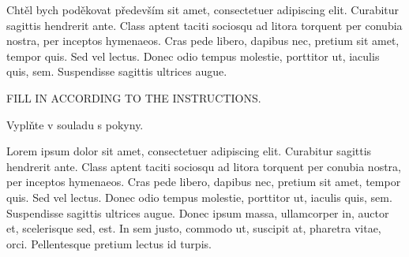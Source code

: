 \documentclass[czech,master]{ctufit-thesis}
\begin{document}
 
\frontmatter\frontmatterinit



\thispagestyle{empty}
\cleardoublepage

\maketitle

\imprintpage

\tableofcontents
\listoffigures
\begingroup
\let\clearpage\relax
\listoftables
\lstlistoflistings
\endgroup

\begin{acknowledgmentpage}
	Chtěl bych poděkovat především sit amet, consectetuer adipiscing elit. Curabitur sagittis hendrerit ante. Class aptent taciti sociosqu ad litora torquent per conubia nostra, per inceptos hymenaeos. Cras pede libero, dapibus nec, pretium sit amet, tempor quis. Sed vel lectus. Donec odio tempus molestie, porttitor ut, iaculis quis, sem. Suspendisse sagittis ultrices augue.
\end{acknowledgmentpage} 


\begin{declarationpage}
FILL IN ACCORDING TO THE INSTRUCTIONS.

Vyplňte v souladu s pokyny.

Lorem ipsum dolor sit amet, consectetuer adipiscing elit. Curabitur sagittis hendrerit ante. Class aptent taciti sociosqu ad litora torquent per conubia nostra, per inceptos hymenaeos. Cras pede libero, dapibus nec, pretium sit amet, tempor quis. Sed vel lectus. Donec odio tempus molestie, porttitor ut, iaculis quis, sem. Suspendisse sagittis ultrices augue. Donec ipsum massa, ullamcorper in, auctor et, scelerisque sed, est. In sem justo, commodo ut, suscipit at, pharetra vitae, orci. Pellentesque pretium lectus id turpis.
\end{declarationpage}
\end{document}
